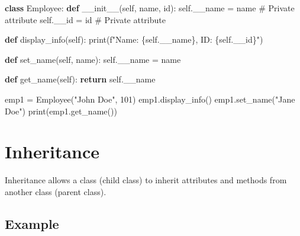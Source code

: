 \documentclass[
  letterpaper,
  DIV=11,
  numbers=noendperiod]{scrreprt}
\newenvironment{Shaded}{\begin{snugshade}}{\end{snugshade}}
\newcommand{\BuiltInTok}[1]{\textcolor[rgb]{0.00,0.23,0.31}{#1}}
\newcommand{\CommentTok}[1]{\textcolor[rgb]{0.37,0.37,0.37}{#1}}
\newcommand{\ControlFlowTok}[1]{\textcolor[rgb]{0.00,0.23,0.31}{\textbf{#1}}}
\newcommand{\DecValTok}[1]{\textcolor[rgb]{0.68,0.00,0.00}{#1}}
\newcommand{\FunctionTok}[1]{\textcolor[rgb]{0.28,0.35,0.67}{#1}}
\newcommand{\KeywordTok}[1]{\textcolor[rgb]{0.00,0.23,0.31}{\textbf{#1}}}
\newcommand{\NormalTok}[1]{\textcolor[rgb]{0.00,0.23,0.31}{#1}}
\newcommand{\OperatorTok}[1]{\textcolor[rgb]{0.37,0.37,0.37}{#1}}
\newcommand{\SpecialCharTok}[1]{\textcolor[rgb]{0.37,0.37,0.37}{#1}}
\newcommand{\SpecialStringTok}[1]{\textcolor[rgb]{0.13,0.47,0.30}{#1}}
\newcommand{\StringTok}[1]{\textcolor[rgb]{0.13,0.47,0.30}{#1}}
\newcommand{\VariableTok}[1]{\textcolor[rgb]{0.07,0.07,0.07}{#1}}
\begin{document}
\begin{Shaded}
\begin{Highlighting}[]
\KeywordTok{class}\NormalTok{ Employee:}
    \KeywordTok{def} \FunctionTok{\_\_init\_\_}\NormalTok{(}\VariableTok{self}\NormalTok{, name, }\BuiltInTok{id}\NormalTok{):}
        \VariableTok{self}\NormalTok{.\_\_name }\OperatorTok{=}\NormalTok{ name  }\CommentTok{\# Private attribute}
        \VariableTok{self}\NormalTok{.\_\_id }\OperatorTok{=} \BuiltInTok{id}      \CommentTok{\# Private attribute}
    
    \KeywordTok{def}\NormalTok{ display\_info(}\VariableTok{self}\NormalTok{):}
        \BuiltInTok{print}\NormalTok{(}\SpecialStringTok{f"Name: }\SpecialCharTok{\{}\VariableTok{self}\SpecialCharTok{.}\NormalTok{\_\_name}\SpecialCharTok{\}}\SpecialStringTok{, ID: }\SpecialCharTok{\{}\VariableTok{self}\SpecialCharTok{.}\NormalTok{\_\_id}\SpecialCharTok{\}}\SpecialStringTok{"}\NormalTok{)}

    \KeywordTok{def}\NormalTok{ set\_name(}\VariableTok{self}\NormalTok{, name):}
        \VariableTok{self}\NormalTok{.\_\_name }\OperatorTok{=}\NormalTok{ name}

    \KeywordTok{def}\NormalTok{ get\_name(}\VariableTok{self}\NormalTok{):}
        \ControlFlowTok{return} \VariableTok{self}\NormalTok{.\_\_name}

\NormalTok{emp1 }\OperatorTok{=}\NormalTok{ Employee(}\StringTok{"John Doe"}\NormalTok{, }\DecValTok{101}\NormalTok{)}
\NormalTok{emp1.display\_info()}
\NormalTok{emp1.set\_name(}\StringTok{"Jane Doe"}\NormalTok{)}
\BuiltInTok{print}\NormalTok{(emp1.get\_name())}
\end{Highlighting}
\end{Shaded}

\section{Inheritance}\label{inheritance-1}

Inheritance allows a class (child class) to inherit attributes and
methods from another class (parent class).

\subsection{Example}\label{example-8}
\end{document}
